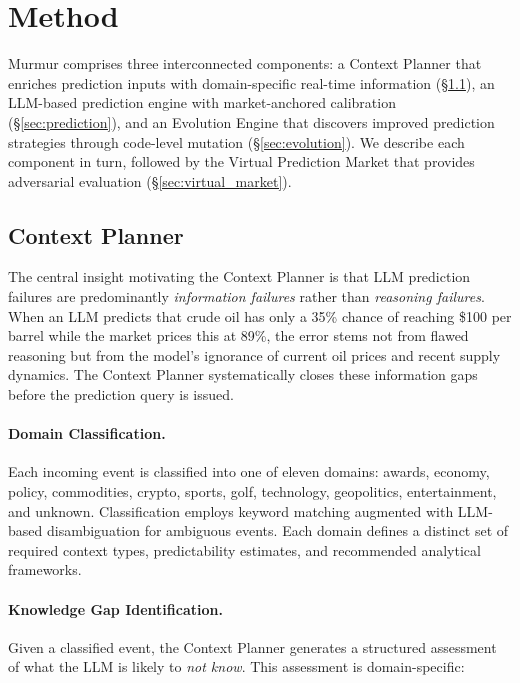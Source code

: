 \section{Method}
\label{sec:method}

Murmur comprises three interconnected components: a Context Planner that enriches prediction inputs with domain-specific real-time information (\S\ref{sec:context_planner}), an LLM-based prediction engine with market-anchored calibration (\S\ref{sec:prediction}), and an Evolution Engine that discovers improved prediction strategies through code-level mutation (\S\ref{sec:evolution}). We describe each component in turn, followed by the Virtual Prediction Market that provides adversarial evaluation (\S\ref{sec:virtual_market}).

\subsection{Context Planner}
\label{sec:context_planner}

The central insight motivating the Context Planner is that LLM prediction failures are predominantly \emph{information failures} rather than \emph{reasoning failures}. When an LLM predicts that crude oil has only a 35\% chance of reaching \$100 per barrel while the market prices this at 89\%, the error stems not from flawed reasoning but from the model's ignorance of current oil prices and recent supply dynamics. The Context Planner systematically closes these information gaps before the prediction query is issued.

\paragraph{Domain Classification.} Each incoming event is classified into one of eleven domains: awards, economy, policy, commodities, crypto, sports, golf, technology, geopolitics, entertainment, and unknown. Classification employs keyword matching augmented with LLM-based disambiguation for ambiguous events. Each domain defines a distinct set of required context types, predictability estimates, and recommended analytical frameworks.

\paragraph{Knowledge Gap Identification.} Given a classified event, the Context Planner generates a structured assessment of what the LLM is likely to \emph{not know}. This assessment is domain-specific:

